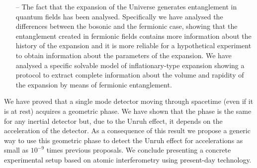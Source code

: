 \begin{list}{}{\leftmargin=1em}
\begin{itemize}
 \item[--] The fact that the expansion of the Universe generates entanglement in quantum fields has been analysed. Specifically we have analysed the differences between the bosonic and the fermionic case, showing that the entanglement created in fermionic fields contains more information about the history of the expansion and it is more reliable for a hypothetical experiment to obtain information about the parameters of the expansion. We have analysed a specific solvable model of inflationary-type expansion showing a protocol to extract complete information about the volume and rapidity of the expansion by means of fermionic entanglement. 
 \end{itemize}
 \item We have proved that a single mode detector moving through spacetime (even if it is at rest) acquires a geometric phase. We have shown that the phase is the same for any inertial detector but, due to the Unruh effect, it depends on the acceleration of the detector. As a consequence of this result we propose a generic way to use this geometric phase to detect the Unruh effect for accelerations as small as $10^{-9}$ times previous proposals. We conclude presenting a concrete experimental setup based on atomic interferometry using present-day technology. 
 \end{list}
\cleardoublepage


